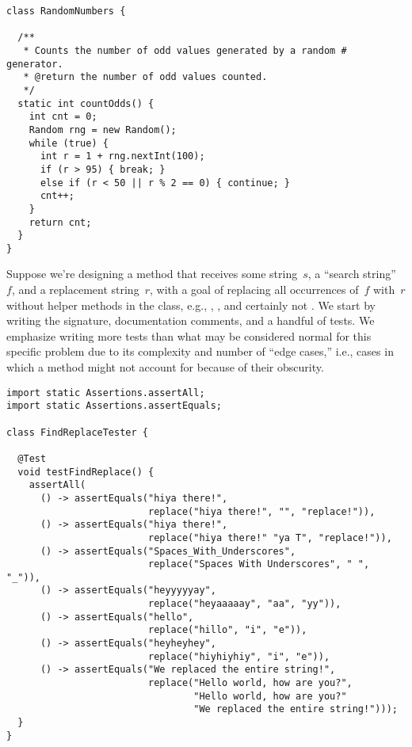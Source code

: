 \begin{lstlisting}[language=MyJava]
class RandomNumbers {

  /**
   * Counts the number of odd values generated by a random # generator.
   * @return the number of odd values counted.
   */
  static int countOdds() {
    int cnt = 0;
    Random rng = new Random();
    while (true) {
      int r = 1 + rng.nextInt(100);
      if (r > 95) { break; }
      else if (r < 50 || r % 2 == 0) { continue; }
      cnt++;
    }
    return cnt;
  }
}
\end{lstlisting}

Suppose we're designing a method that receives some string~$s$, a ``search string''~$f$, and a replacement string~$r$, with a goal of replacing all occurrences of~$f$ with~$r$ without helper methods in the  class, e.g., , , and certainly not . 
We start by writing the signature, documentation comments, and a handful of tests. 
We emphasize writing more tests than what may be considered normal for this specific problem due to its complexity and number of ``edge cases,'' i.e., cases in which a method might not account for because of their obscurity.

\begin{lstlisting}[language=MyJava]
import static Assertions.assertAll;
import static Assertions.assertEquals;

class FindReplaceTester {

  @Test
  void testFindReplace() {
    assertAll(
      () -> assertEquals("hiya there!",
                         replace("hiya there!", "", "replace!")),
      () -> assertEquals("hiya there!",
                         replace("hiya there!" "ya T", "replace!")),
      () -> assertEquals("Spaces_With_Underscores",
                         replace("Spaces With Underscores", " ", "_")),
      () -> assertEquals("heyyyyyay",
                         replace("heyaaaaay", "aa", "yy")),
      () -> assertEquals("hello",
                         replace("hillo", "i", "e")),
      () -> assertEquals("heyheyhey",
                         replace("hiyhiyhiy", "i", "e")),
      () -> assertEquals("We replaced the entire string!",
                         replace("Hello world, how are you?", 
                                 "Hello world, how are you?" 
                                 "We replaced the entire string!")));
  }
}
\end{lstlisting}

